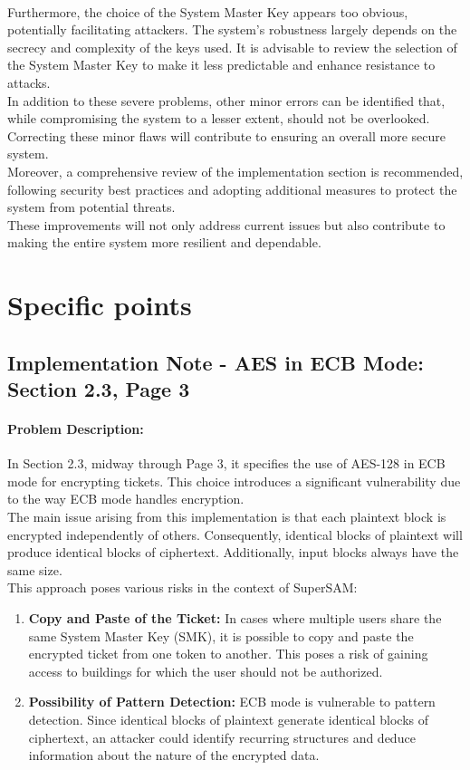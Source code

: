 \documentclass[12pt]{article}
\begin{document}
\\
Furthermore, the choice of the System Master Key appears too obvious, potentially facilitating attackers. The system's robustness largely depends on the secrecy and complexity of the keys used. It is advisable to review the selection of the System Master Key to make it less predictable and enhance resistance to attacks.
\\
In addition to these severe problems, other minor errors can be identified that, while compromising the system to a lesser extent, should not be overlooked. Correcting these minor flaws will contribute to ensuring an overall more secure system.
\\
Moreover, a comprehensive review of the implementation section is recommended, following security best practices and adopting additional measures to protect the system from potential threats.
\\
These improvements will not only address current issues but also contribute to making the entire system more resilient and dependable.

\section{Specific points}

\subsection{Implementation Note - AES in ECB Mode: Section 2.3, Page 3}
    \paragraph{Problem Description:}
    In Section 2.3, midway through Page 3, it specifies the use of AES-128 in ECB mode for encrypting tickets. This choice introduces a significant vulnerability due to the way ECB mode handles encryption.
    \\
    The main issue arising from this implementation is that each plaintext block is encrypted independently of others. Consequently, identical blocks of plaintext will produce identical blocks of ciphertext. Additionally, input blocks always have the same size.
    \\
    This approach poses various risks in the context of SuperSAM:

    \begin{enumerate}[label=\arabic*, ref=\arabic*]
        \item \textbf{Copy and Paste of the Ticket:} \label{itm:one} In cases where multiple users share the same System Master Key (SMK), it is possible to copy and paste the encrypted ticket from one token to another. This poses a risk of gaining access to buildings for which the user should not be authorized.

        \item \textbf{Possibility of Pattern Detection:} \label{itm:two} ECB mode is vulnerable to pattern detection. Since identical blocks of plaintext generate identical blocks of ciphertext, an attacker could identify recurring structures and deduce information about the nature of the encrypted data.
    \end{enumerate}
\end{document}
